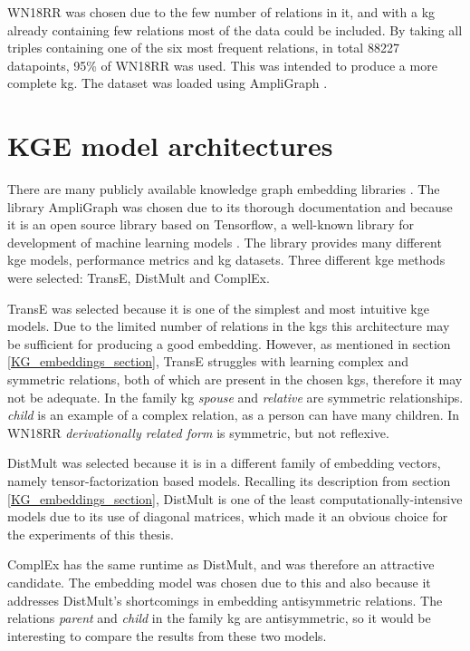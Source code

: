WN18RR was chosen due to the few number of relations in it, and with a \gls{kg} already containing few relations most of the data could be included.
By taking all triples containing one of the six most frequent relations, in total 88227 datapoints, 95\% of WN18RR was used. This was intended to produce a more complete \gls{kg}. The dataset was loaded using AmpliGraph \cite{ampligraph}.

\section{KGE model architectures}
\label{selected_KG_embedding_models}
There are many publicly available knowledge graph embedding libraries \cite{libkge, chandrahas-etal-2018-towards, ali2021pykeen}. The library AmpliGraph was chosen due to its thorough documentation and because it is an open source library based on Tensorflow, a well-known library for development of machine learning models \cite{tensorflow}. The library provides many different \gls{kge} models, performance metrics and \gls{kg} datasets. Three different \gls{kge} methods were selected: TransE, DistMult and ComplEx. 

TransE was selected because it is one of the simplest and most intuitive \gls{kge} models. Due to the limited number of relations in the \glspl{kg} this architecture may be sufficient for producing a good embedding. However, as mentioned in section \ref{KG_embeddings_section}, TransE struggles with learning complex and symmetric relations, both of which are present in the chosen \glspl{kg}, therefore it may not be adequate. In the family \gls{kg} \textit{spouse} and \textit{relative} are symmetric relationships. \textit{child} is an example of a complex relation, as a person can have many children. In WN18RR \textit{derivationally related form} is symmetric, but not reflexive.

DistMult was selected because it is in a different family of embedding vectors, namely tensor-factorization based models. Recalling its description from section \ref{KG_embeddings_section}, DistMult is one of the least computationally-intensive models due to its use of diagonal matrices, which made it an obvious choice for the experiments of this thesis.

ComplEx has the same runtime as DistMult, and was therefore an attractive candidate. The embedding model was chosen due to this and also because it addresses DistMult's shortcomings in embedding antisymmetric relations. The relations \textit{parent} and \textit{child} in the family \gls{kg} are antisymmetric, so it would be interesting to compare the results from these two models.


